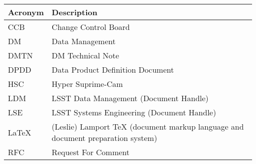 \addtocounter{table}{-1}
\begin{longtable}{p{}p{}}\hline
\textbf{Acronym} & \textbf{Description}  \\\hline

CCB & Change Control Board \\\hline
DM & Data Management \\\hline
DMTN & DM Technical Note \\\hline
DPDD & Data Product Definition Document \\\hline
HSC & Hyper Suprime-Cam \\\hline
LDM & LSST Data Management (Document Handle) \\\hline
LSE & LSST Systems Engineering (Document Handle) \\\hline
LaTeX & (Leslie) Lamport TeX (document markup language and document preparation system) \\\hline
RFC & Request For Comment \\\hline
\end{longtable}
